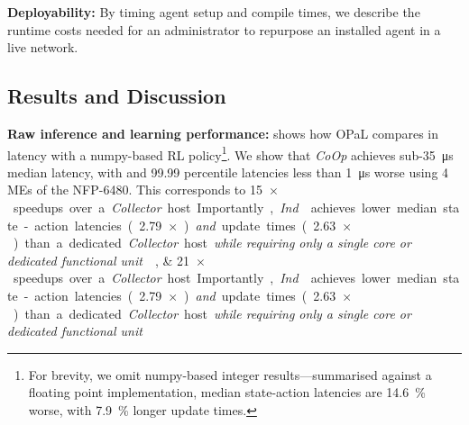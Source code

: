 \documentclass[
sigconf,natbib=false
]{acmart}
\newcommand{\fakepara}[1]{\noindent\textbf{#1:}}
\newcommand{\approachshort}{OPaL}
\newcommand{\Coopfw}{\emph{CoOp}}
\newcommand{\Indfw}{\emph{Ind}}
\begin{document}

\fakepara{Deployability}
By timing agent setup and compile times, we describe the runtime costs needed for an administrator to repurpose an installed agent in a live network.

\subsection{Results and Discussion}\label{sec:results}
\fakepara{Raw inference and learning performance}
 shows how \approachshort{} compares in latency with a numpy-based RL policy\footnote{For brevity, we omit numpy-based integer results---summarised against a floating point implementation, median state-action latencies are \SI{14.6}{\percent} worse, with \SI{7.9}{\percent} longer update times.}.
We show that \Coopfw{} achieves sub-\SI{35}{\micro\second} median latency, with  and \num{99.99} percentile latencies less than \SI{1}{\micro\second} worse using 4 MEs of the NFP-6480.
This corresponds to \SIlist{15;21}{$\times$} speedups over a \emph{Collector} host.
Importantly, \Indfw{} achieves lower median state-action latencies (\SI{2.79}{$\times$}) \emph{and} update times (\SI{2.63}{$\times$}) than a dedicated \emph{Collector} host \emph{while requiring only a single core or dedicated functional unit}.

\newlength{\resultplotwidth}
\setlength{\resultplotwidth}{0.88\linewidth}

\begin{table}
	\caption{Latencies and computation times for \approachshort{} versus commodity hardware hosts. On-device execution is crucial in not only lowering latencies, but in reducing tail latencies. Lower is better, with the best marked \emph{in bold}.\label{tab:lats}}
\end{table}

\begin{table}
	\caption{Action and update throughputs for \approachshort{} versus commodity hardware hosts. Most designs cannot scale online performance with additional cores. Higher is better, with the best marked \emph{in bold}.\label{tab:tputs}}
\end{table}
\end{document}
